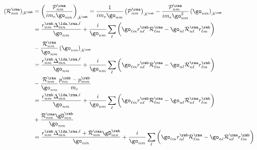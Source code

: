 \begin{align}\label{a_rgendevnnn}
({\cal R}^{\rma}_{nm})_{;k^{\rmb}}&=\left(\frac{{\cal P}^{\rma}_{nm}}{im_e\go_{nm}}\right)_{;k^{\rmb}}
=
\frac{1}
{im_e\go_{nm}}
\left(
{\cal P}^{\rma}_{nm}
\right)_{;k^{\rmb}}
-
\frac{{\cal P}^{\rma}_{nm}}
{im_e\go^2_{nm}}
\left(
\go_{nm}
\right)_{;k^{\rmb}}
\nonumber \\
&=
\frac{r^{\rmb}_{nm}
\Delta^{\lda,\rma,\ell}_{mn}}
{\go_{nm}}
+
\frac{i}{\go_{nm}}
\sum_{\ell}
\bigg(
\go_{\ell m}
r^{\rmb}_{n\ell}
{\cal R}^{\rma}_{\ell m}
-
\go_{n\ell}
{\cal R}^{\rma}_{n\ell}
r^{\rmb}_{\ell m}
\bigg)
\nonumber \\
&
-
\frac{{\cal R}^{\rma}_{nm}}
{\go_{nm}}
\left(
\go_{nm}
\right)_{;k^{\rmb}}
\nonumber \\
&=
\frac{r^{\rmb}_{nm}
\Delta^{\lda,\rma,\ell}_{mn}}
{\go_{nm}}
+
\frac{i}{\go_{nm}}
\sum_{\ell}
\bigg(
\go_{\ell m}
r^{\rmb}_{n\ell}
{\cal R}^{\rma}_{\ell m}
-
\go_{n\ell}
{\cal R}^{\rma}_{n\ell}
r^{\rmb}_{\ell m}
\bigg)
\nonumber \\
&
-
\frac{{\cal R}^{\rma}_{nm}}
{\go_{nm}}
\frac{p^\rmb_{nn}-p^\rmb_{mm}}{m_e}
\nonumber \\
&=
\frac{r^{\rmb}_{nm}
\Delta^{\lda,\rma,\ell}_{mn}}
{\go_{nm}}
+
\frac{i}{\go_{nm}}
\sum_{\ell}
\bigg(
\go_{\ell m}
r^{\rmb}_{n\ell}
{\cal R}^{\rma}_{\ell m}
-
\go_{n\ell}
{\cal R}^{\rma}_{n\ell}
r^{\rmb}_{\ell m}
\bigg)
\nonumber \\
&
+
\frac{
{\cal R}^{\rma}_{nm}\gD^\rmb_{mn}
}
{\go_{nm}}
\nonumber \\
&=
\frac{r^{\rmb}_{nm}
\Delta^{\lda,\rma,\ell}_{mn}
+
{\cal R}^{\rma}_{nm}\gD^\rmb_{mn}
}
{\go_{nm}}
+
\frac{i}{\go_{nm}}
\sum_{\ell}
\bigg(
\go_{\ell m}
r^{\rmb}_{n\ell}
{\cal R}^{\rma}_{\ell m}
-
\go_{n\ell}
{\cal R}^{\rma}_{n\ell}
r^{\rmb}_{\ell m}
\bigg)
\end{align}
